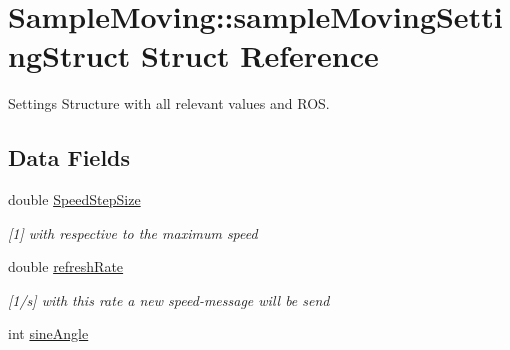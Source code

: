 \hypertarget{structSampleMoving_1_1sampleMovingSettingStruct}{\section{Sample\-Moving\-:\-:sample\-Moving\-Setting\-Struct Struct Reference}
\label{structSampleMoving_1_1sampleMovingSettingStruct}
}


Settings Structure with all relevant values and R\-O\-S.  


\subsection*{Data Fields}
\begin{DoxyCompactItemize}
\item 
\hypertarget{structSampleMoving_1_1sampleMovingSettingStruct_a7149b75955e1f42194433bc451688da5}{double \hyperlink{structSampleMoving_1_1sampleMovingSettingStruct_a7149b75955e1f42194433bc451688da5}{Speed\-Step\-Size}}\label{structSampleMoving_1_1sampleMovingSettingStruct_a7149b75955e1f42194433bc451688da5}

\begin{DoxyCompactList}\small\item\em \mbox{[}1\mbox{]} with respective to the maximum speed \end{DoxyCompactList}\item 
\hypertarget{structSampleMoving_1_1sampleMovingSettingStruct_a6e0c54b02f6c570887fb9026388feb30}{double \hyperlink{structSampleMoving_1_1sampleMovingSettingStruct_a6e0c54b02f6c570887fb9026388feb30}{refresh\-Rate}}\label{structSampleMoving_1_1sampleMovingSettingStruct_a6e0c54b02f6c570887fb9026388feb30}

\begin{DoxyCompactList}\small\item\em \mbox{[}1/s\mbox{]} with this rate a new speed-\/message will be send \end{DoxyCompactList}\item 
\hypertarget{structSampleMoving_1_1sampleMovingSettingStruct_ad60b9d7d4202a20facc5f14707657366}{int \hyperlink{structSampleMoving_1_1sampleMovingSettingStruct_ad60b9d7d4202a20facc5f14707657366}{sine\-Angle}}\label{structSampleMoving_1_1sampleMovingSettingStruct_ad60b9d7d4202a20facc5f14707657366}


\end{DoxyCompactItemize}
